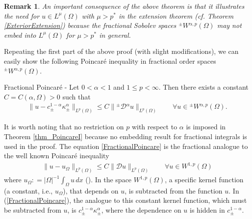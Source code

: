 \documentclass[leqno,final]{siamltex}
\numberwithin{equation}{section}
\newtheorem{remark}{Remark}[section]
\newcommand{\Ome}{{\Omega}}
\renewcommand{\(}{\bigl(}
\renewcommand{\)}{\bigr)}
\begin{document}
   \begin{remark}
   	An important consequence of the above theorem is that it illustrates the need for $u \in L^{\mu}(\Omega)$ with $\mu > p^*$
   	in the extension theorem (cf. Theorem \ref{ExteriorExtension}) because the fractional Sobolev spaces 
   	${^{\pm}}{W}{^{\alpha,p}}(\Omega)$ may not embed into $L^{\mu}(\Omega)$ for $\mu > p^*$ in general.
   \end{remark}
   
   Repeating the first part of the above proof (with slight modifications),  we can easily show the 
   	following Poincar\'e inequality in fractional order spaces ${^{\pm}}{W}{^{\alpha,p}}(\Omega)$. 
   
   \begin{theorem}\label{thm_PoincareI}
   	Fractional Poincar\'e - Let $0 < \alpha <1$ and $1 \leq p < \infty$. Then there exists a constant $C = C(\alpha, \Omega)>0$ such that
   	\begin{align}\label{FractionalPoincare}
   	\|u - c_{\pm}^{1-\alpha}\kappa_{\pm}^{\alpha}\|_{L^{p}(\Omega)} \leq C\|{^{\pm}}{\mathcal{D}}{^{\alpha}} u\|_{L^{p}(\Omega)}
   	\qquad \forall u \in {^{\pm}}{W}{^{\alpha,p}}(\Omega).
   	\end{align}
   \end{theorem}
   
   It is worth noting that no restriction on $p$ with respect to $\alpha$ is imposed in 
   Theorem \ref{thm_PoincareI} because no embedding result for fractional integrals 
   is used in the proof. The equation \eqref{FractionalPoincare} is the fractional analogue to the well known Poincar\'e inequality 
   \begin{align}\label{Poincare}
       \|u - u_{\Omega}\|_{L^{p}(\Omega)} \leq C \| \mathcal{D} u \|_{L^{p}(\Omega)} \qquad \forall u \in W^{1,p}(\Omega)
   \end{align}
   where $u_{\Omega} : = |\Omega|^{-1}\int_{\Omega} u \,dx$ (\cite{Evans}). In the space $W^{1,p}(\Omega)$, a specific kernel function (a constant, i.e., $u_\Ome$), that depends on $u$, is subtracted from the function $u$. In (\ref{FractionalPoincare}), the analogue to this constant kernel 
   function, which must be subtracted from $u$, is $c_{\pm}^{1-\alpha} \kappa_{\pm}^{\alpha}$, where the   dependence on $u$ is hidden in $c_{\pm}^{1-\alpha}$. 
   
\end{document}
